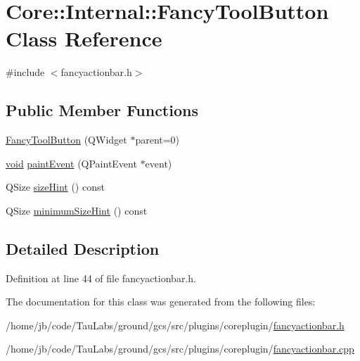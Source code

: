 \hypertarget{class_core_1_1_internal_1_1_fancy_tool_button}{\section{\-Core\-:\-:\-Internal\-:\-:\-Fancy\-Tool\-Button \-Class \-Reference}
\label{class_core_1_1_internal_1_1_fancy_tool_button}
}


{\ttfamily \#include $<$fancyactionbar.\-h$>$}

\subsection*{\-Public \-Member \-Functions}
\begin{DoxyCompactItemize}
\item 
\hyperlink{group___core_plugin_gaa49bf0d75cd7c6fae6f16affc94534d4}{\-Fancy\-Tool\-Button} (\-Q\-Widget $\ast$parent=0)
\item 
\hyperlink{group___u_a_v_objects_plugin_ga444cf2ff3f0ecbe028adce838d373f5c}{void} \hyperlink{group___core_plugin_ga2904020ad431428edd939ec8bac39c59}{paint\-Event} (\-Q\-Paint\-Event $\ast$event)
\item 
\-Q\-Size \hyperlink{group___core_plugin_ga2ee61871e7efb65dabbc51706db84ea3}{size\-Hint} () const 
\item 
\-Q\-Size \hyperlink{group___core_plugin_ga7067d0c58b6084aea70a0e044acb0e91}{minimum\-Size\-Hint} () const 
\end{DoxyCompactItemize}


\subsection{\-Detailed \-Description}


\-Definition at line 44 of file fancyactionbar.\-h.



\-The documentation for this class was generated from the following files\-:\begin{DoxyCompactItemize}
\item 
/home/jb/code/\-Tau\-Labs/ground/gcs/src/plugins/coreplugin/\hyperlink{fancyactionbar_8h}{fancyactionbar.\-h}\item 
/home/jb/code/\-Tau\-Labs/ground/gcs/src/plugins/coreplugin/\hyperlink{fancyactionbar_8cpp}{fancyactionbar.\-cpp}\end{DoxyCompactItemize}
